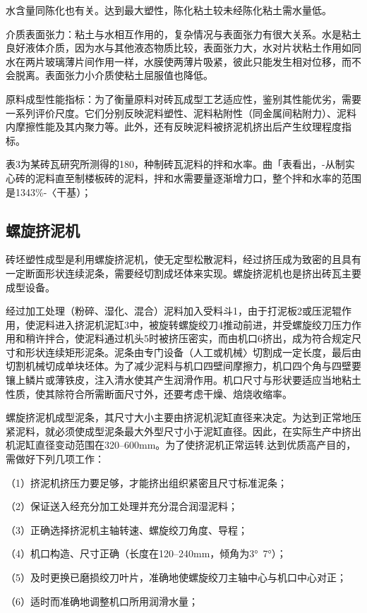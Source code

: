 \documentclass{ctexbook}
\begin{document}
水含量同陈化也有关。达到最大塑性，陈化粘土较未经陈化粘土需水量低。

介质表面张力：粘土与水相互作用的，复杂情况与表面张力有很大关系。水是粘土良好液体介质，因为水与其他液态物质比较，表面张力大，水对片状粘土作用如同水在两片玻璃薄片间作用一样，水膜使两薄片吸紧，彼此只能发生相对位移，而不会脱离。表面张力小介质使粘土屈服值也降低。

原料成型性能指标：为了衡量原料对砖瓦成型工艺适应性，鉴别其性能优劣，需要一系列评价尺度。它们分别反映泥料塑性、泥料粘附性（同金属间粘附力）、泥料内摩擦性能及其内聚力等。此外，还有反映泥料被挤泥机挤出后产生纹理程度指标。

表3为某砖瓦研究所测得的180，种制砖瓦泥料的拌和水率。曲「表看出，-从制实心砖的泥料直至制楼板砖的泥料，拌和水需要量逐渐增力口，整个拌和水率的范围是1343\%-〈干基）；

\subsection{螺旋挤泥机}
砖坯塑性成型是利用螺旋挤泥机，使无定型松散泥料，经过挤压成为致密的且具有一定断面形状连续泥条，需要经切割成坯体来实现。螺旋挤泥机也是挤出砖瓦主要成型设备。

经过加工处理（粉碎、湿化、混合）泥料加入受料斗1，由于打泥板2或压泥辊作用，使泥料进入挤泥机泥缸3中，被旋转螺旋绞刀4推动前进，并受螺旋绞刀压力作用和稍许拌合，使泥料通过机头5时被挤压密实，而由机口6挤出，成为符合规定尺寸和形状连续矩形泥条。泥条由专门设备（人工或机械〉切割成一定长度，最后由切割机械切成单块坯体。为了减少泥料与机口四壁间摩擦力，机口四个角与四壁要镶上鳞片或薄铁皮，注入清水使其产生润滑作用。机口尺寸与形状要适应当地粘土性质，使其除符合所需断面尺寸外，还要考虑干燥、焙烧收缩率。

螺旋挤泥机成型泥条，其尺寸大小主要由挤泥机泥缸直径来决定。为达到正常地压紧泥料，就必须使成型泥条最大外型尺寸小于泥缸直径。因此，在实际生产中挤出机泥缸直径变动范围在320--600mm。为了使挤泥机正常运转.达到优质高产目的，需做好下列几项工作：

（1）挤泥机挤压力要足够，才能挤出组织紧密且尺寸标准泥条；

（2）保证送入经充分加工处理并充分混合润湿泥料；

（3）正确选择挤泥机主轴转速、螺旋绞刀角度、导程；

（4）机口构造、尺寸正确（长度在120--240mm，倾角为3°~7°）；

（5）及时更换已磨损绞刀叶片，准确地使螺旋绞刀主轴中心与机口中心对正；

（6）适时而准确地调整机口所用润滑水量；
\end{document}
